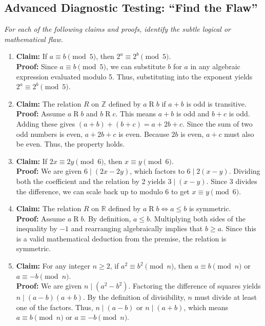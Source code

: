 \documentclass[11pt, a4paper]{article}
\theoremstyle{definition}
\theoremstyle{remark}
\newcommand{\R}{\mathbb{R}}
\newcommand{\Z}{\mathbb{Z}}
\begin{document}
\subsection{Advanced Diagnostic Testing: ``Find the Flaw''}
\textit{For each of the following claims and proofs, identify the subtle logical or mathematical flaw.}
\begin{enumerate}[label=\textbf{\arabic*.}, resume]
    \item \textbf{Claim:} If $a \equiv b \pmod{5}$, then $2^a \equiv 2^b \pmod{5}$.\\
    \textbf{Proof:} Since $a \equiv b \pmod{5}$, we can substitute $b$ for $a$ in any algebraic expression evaluated modulo 5. Thus, substituting into the exponent yields $2^a \equiv 2^b \pmod{5}$.
    
    \item \textbf{Claim:} The relation $R$ on $\Z$ defined by $a \mathrel{R} b$ if $a+b$ is odd is transitive.\\
    \textbf{Proof:} Assume $a \mathrel{R} b$ and $b \mathrel{R} c$. This means $a+b$ is odd and $b+c$ is odd. Adding these gives $(a+b) + (b+c) = a + 2b + c$. Since the sum of two odd numbers is even, $a + 2b + c$ is even. Because $2b$ is even, $a+c$ must also be even. Thus, the property holds.
    
    \item \textbf{Claim:} If $2x \equiv 2y \pmod{6}$, then $x \equiv y \pmod{6}$.\\
    \textbf{Proof:} We are given $6 \mid (2x - 2y)$, which factors to $6 \mid 2(x - y)$. Dividing both the coefficient and the relation by 2 yields $3 \mid (x - y)$. Since 3 divides the difference, we can scale back up to modulo 6 to get $x \equiv y \pmod{6}$.
    
    \item \textbf{Claim:} The relation $R$ on $\R$ defined by $a \mathrel{R} b \iff a \le b$ is symmetric.\\
    \textbf{Proof:} Assume $a \mathrel{R} b$. By definition, $a \le b$. Multiplying both sides of the inequality by $-1$ and rearranging algebraically implies that $b \ge a$. Since this is a valid mathematical deduction from the premise, the relation is symmetric.
    
    \item \textbf{Claim:} For any integer $n \ge 2$, if $a^2 \equiv b^2 \pmod{n}$, then $a \equiv b \pmod{n}$ or $a \equiv -b \pmod{n}$.\\
    \textbf{Proof:} We are given $n \mid (a^2 - b^2)$. Factoring the difference of squares yields $n \mid (a - b)(a + b)$. By the definition of divisibility, $n$ must divide at least one of the factors. Thus, $n \mid (a - b)$ or $n \mid (a + b)$, which means $a \equiv b \pmod{n}$ or $a \equiv -b \pmod{n}$.
\end{enumerate}
\end{document}
